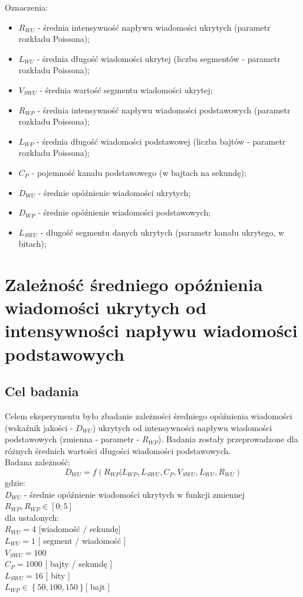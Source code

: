 \documentclass[a4paper, twoside, 12pt]{report}
\begin{document}
    Oznaczenia:
    \begin{itemize} \itemsep1pt \parskip0pt 
        \item \( R_{WU} \) - średnia intensywność napływu wiadomości ukrytych (parametr rozkładu Poissona);
        \item \( L_{WU} \) - średnia długość wiadomości ukrytej (liczba segmentów - parametr rozkładu Poissona);
        \item \( V_{SWU} \) - średnia wartość segmentu wiadomości ukrytej;
        \item \( R_{WP} \) - średnia intensywność napływu wiadomości podstawowych (parametr rozkładu Poissona);
        \item \( L_{WP} \) - średnia długość wiadomości podstawowej (liczba bajtów - parametr rozkładu Poissona);
        \item \( C_P \) - pojemność kanału podstawowego (w bajtach na sekundę);
        \item \( D_{WU} \) - średnie opóźnienie wiadomości ukrytych;
        \item \( D_{WP} \) - średnie opóźnienie wiadomości podstawowych;
        \item \( L_{SWU} \) - długość segmentu danych ukrytych (parametr kanału ukrytego, w bitach);
    \end{itemize}



    \section{Zależność średniego opóźnienia wiadomości ukrytych od intensywności napływu wiadomości podstawowych}
        \subsection{Cel badania}
            Celem eksperymentu było zbadanie zależności średniego opóźnienia wiadomości (wskaźnik jakości - \( D_{WU} \))
            ukrytych od intensywności napływu wiadomości podstawowych (zmienna - parametr - \(R_{WP}\)).
            Badania zostały przeprowadzone dla różnych średnich wartości długości wiadomości
            podstawowych. \\
            Badana zależność: \\
                $$ D_{WU} = f(R_{WP} | L_{WP}, L_{SWU}, C_P, V_{SWU}, L_{WU}, R_{WU}) $$
            gdzie:\\
                \( D_{WU} \) - średnie opóźnienie wiadomości ukrytych w funkcji zmiennej \( R_{WP}, R_{WP} \in [0;5]\) \\
                dla ustalonych: \\
                \( R_{WU}  = 4 \) [wiadomość / sekundę]  \\
                \( L_{WU}  = 1 \) [ segment / wiadomość ]\\
                \( V_{SWU}  = 100 \)\\
                \( C_P  = 1000 \) [ bajty / sekundę ]\\
                \( L_{SWU}  = 16 \) [ bity ]\\
                \( L_{WP}  \in \left\{50, 100, 150\right\} \)[ bajt ] \\
\end{document}
